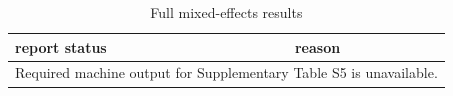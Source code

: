 \begin{table}[htbp]
\centering
\caption{Full mixed-effects results}
\label{tab:s5}
\begin{tabular}{ll}
\hline
report status & reason \\
\hline
\multicolumn{2}{l}{Required machine output for Supplementary Table S5 is unavailable.} \\
\hline
\end{tabular}
\end{table}
